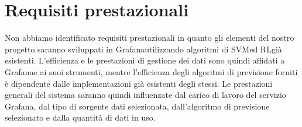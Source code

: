 \section*{Requisiti prestazionali}
	Non abbiamo identificato requisiti prestazionali in quanto gli elementi del nostro progetto saranno sviluppati in Grafana\glosp utilizzando algoritmi di SVM\glosp ed RL\glosp già esistenti. L'efficienza e le prestazioni di gestione dei dati sono quindi affidati a Grafana\glosp e ai suoi strumenti, mentre l'efficienza degli algoritmi di previsione forniti è dipendente dalle implementazioni già esistenti degli stessi. Le prestazioni generali del sistema saranno quindi influenzate dal carico di lavoro del servizio Grafana\glosp, dal tipo di sorgente dati selezionata, dall'algoritmo di previsione selezionato e dalla quantità di dati in uso.
